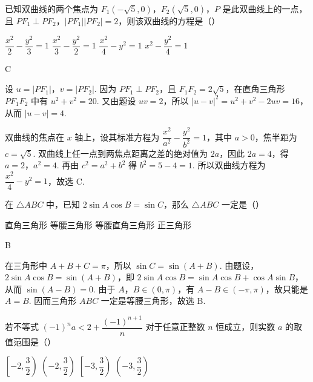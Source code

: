 \begin{problem}
已知双曲线的两个焦点为 \(F_1\left(-\sqrt5,0\right)\)，\(F_2\left(\sqrt5,0\right)\)，\(P\) 是此双曲线上的一点，且 \(PF_1\perp PF_2\)，\(\left|PF_1\right|\left|PF_2\right|=2\)，则该双曲线的方程是（\quad）

\choices
    {\(\dfrac{x^2}{2}-\dfrac{y^2}{3}=1\)}
    {\(\dfrac{x^2}{3}-\dfrac{y^2}{2}=1\)}
    {\(\dfrac{x^2}{4}-y^2=1\)}
    {\(x^2-\dfrac{y^2}{4}=1\)}
\end{problem}

\begin{answer}
C
\end{answer}

\begin{solution}
设 \(u=\left|PF_1\right|\)，\(v=\left|PF_2\right|\). 因为 \(PF_1\perp PF_2\)，且 \(F_1F_2=2\sqrt5\)，在直角三角形 \(PF_1F_2\) 中有 \(u^2+v^2=20\). 又由题设 \(uv=2\)，所以 \(\left|u-v\right|^2=u^2+v^2-2uv=16\)，从而 \(\left|u-v\right|=4\).

双曲线的焦点在 \(x\) 轴上，设其标准方程为 \(\dfrac{x^2}{a^2}-\dfrac{y^2}{b^2}=1\)，其中 \(a>0\)，焦半距为 \(c=\sqrt5\). 双曲线上任一点到两焦点距离之差的绝对值为 \(2a\)，因此 \(2a=4\)，得 \(a=2\)，\(a^2=4\). 再由 \(c^2=a^2+b^2\) 得 \(b^2=5-4=1\). 所以双曲线方程为 \(\dfrac{x^2}{4}-y^2=1\)，故选 C.
\end{solution}

\begin{problem}
在 \(\triangle ABC\) 中，已知 \(2\sin A\cos B=\sin C\)，那么 \(\triangle ABC\) 一定是（\quad）

\choices
    {直角三角形}
    {等腰三角形}
    {等腰直角三角形}
    {正三角形}
\end{problem}

\begin{answer}
B
\end{answer}

\begin{solution}
在三角形中 \(A+B+C=\pi\)，所以 \(\sin C=\sin(A+B)\). 由题设，\(2\sin A\cos B=\sin(A+B)\)，即 \(2\sin A\cos B=\sin A\cos B+\cos A\sin B\)，从而 \(\sin(A-B)=0\). 由于 \(A\)，\(B\in(0,\pi)\)，有 \(A-B\in(-\pi,\pi)\)，故只能是 \(A=B\). 因而三角形 \(ABC\) 一定是等腰三角形，故选 B.
\end{solution}

\begin{problem}
若不等式 \((-1)^na<2+\dfrac{(-1)^{n+1}}{n}\) 对于任意正整数 \(n\) 恒成立，则实数 \(a\) 的取值范围是（\quad）

\choices
    {\(\left[-2,\dfrac32\right)\)}
    {\(\left(-2,\dfrac32\right)\)}
    {\(\left[-3,\dfrac32\right)\)}
    {\(\left(-3,\dfrac32\right)\)}
\end{problem}

